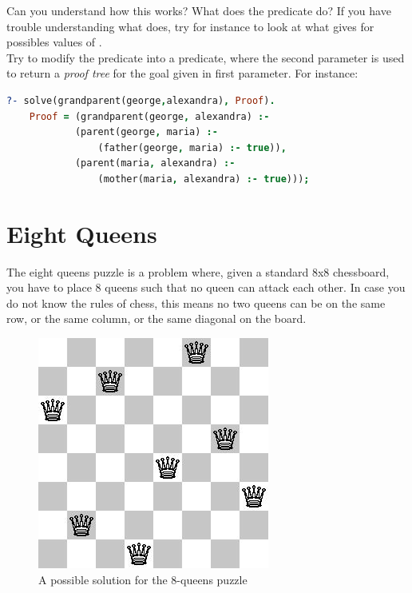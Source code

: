 \documentclass{../../../tp}
\begin{document}
\begin{instruction}
	Can you understand how this works? What does the  predicate do? If you have trouble understanding what   does, try for instance to look at what  gives for possibles values of . \\
	
	Try to modify the  predicate into a  predicate, where the second parameter is used to return a \emph{proof tree} for the goal given in first parameter. For instance:
	
	\begin{lstlisting}[language=prolog]
	?- solve(grandparent(george,alexandra), Proof).
	Proof = (grandparent(george, alexandra) :- 
		    (parent(george, maria) :- 
		        (father(george, maria) :- true)),
		    (parent(maria, alexandra) :- 
		        (mother(maria, alexandra) :- true)));
	\end{lstlisting}
\end{instruction}



\section{Eight Queens}

The eight queens puzzle is a problem where, given a standard 8x8 chessboard, you have to place 8 queens such that no queen can attack each other. In case you do not know the rules of chess, this means no two queens can be on the same row, or the same column, or the same diagonal on the board. 

\begin{figure}[h]
	\centering
	\includegraphics[scale=0.5]{8queens}
	\captionsetup{labelformat=empty}
	\caption{A possible solution for the 8-queens puzzle}
\end{figure}
\end{document}
